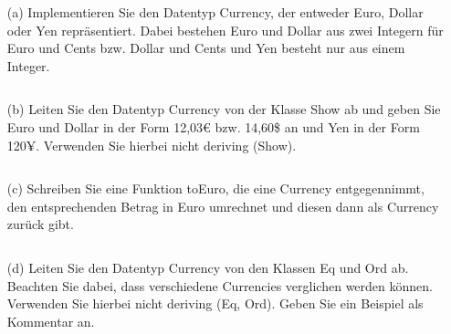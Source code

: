 \begin{itemize}
  \item [(a)] Implementieren Sie den Datentyp Currency, der entweder Euro, Dollar oder Yen repräsentiert. Dabei bestehen Euro und Dollar aus zwei Integern für Euro und Cents bzw. Dollar und Cents und Yen besteht nur aus einem Integer.

  \begin{itemize}
    \item []\inputminted{Haskell}{A5_5a.hs}
  \end{itemize}

  \item [(b)] Leiten Sie den Datentyp Currency von der Klasse Show ab und geben Sie Euro und Dollar in der Form 12,03€ bzw. 14,60\$ an und Yen in der Form 120¥. Verwenden Sie hierbei nicht deriving (Show).
  
  \begin{itemize}
    \item []\inputminted{Haskell}{A5_5b.hs}
  \end{itemize}

  \item [(c)] Schreiben Sie eine Funktion toEuro, die eine Currency entgegennimmt, den entsprechenden Betrag in Euro umrechnet und diesen dann als Currency zurück gibt.
  
  \begin{itemize}
    \item []\inputminted{Haskell}{A5_5c.hs}
  \end{itemize}

  \item [(d)] Leiten Sie den Datentyp Currency von den Klassen Eq und Ord ab. Beachten Sie dabei, dass verschiedene Currencies verglichen werden können. Verwenden Sie hierbei nicht deriving (Eq, Ord). Geben Sie ein Beispiel als Kommentar an.
  
  \begin{itemize}
    \item []\inputminted{Haskell}{A5_5d.hs}
  \end{itemize}

\end{itemize}

